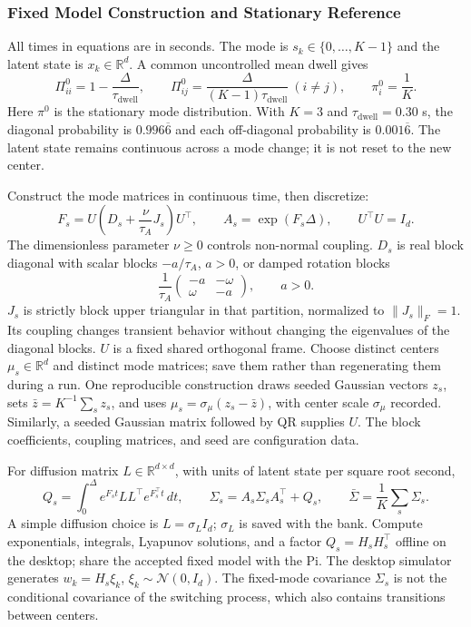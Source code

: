 \subsubsection{Fixed Model Construction and Stationary Reference}
All times in equations are in seconds. The mode is $s_k\in\{0,\ldots,K-1\}$ and the latent state is $x_k\in\mathbb R^d$. A common uncontrolled mean dwell gives
\begin{equation}
 \Pi^0_{ii}=1-\frac{\Delta}{\tau_{\mathrm{dwell}}},\qquad
 \Pi^0_{ij}=\frac{\Delta}{(K-1)\tau_{\mathrm{dwell}}}\ (i\ne j),
 \qquad \pi^0_i=\frac1K.
 \label{eq:baseline-markov}
\end{equation}
Here $\pi^0$ is the stationary mode distribution. With $K=3$ and $\tau_{\mathrm{dwell}}=0.30$ s, the diagonal probability is $0.996\overline6$ and each off-diagonal probability is $0.001\overline6$. The latent state remains continuous across a mode change; it is not reset to the new center.

Construct the mode matrices in continuous time, then discretize:
\begin{equation}
 F_s=U\left(D_s+\frac{\nu}{\tau_A}J_s\right)U^{\top},\qquad
 A_s=\exp(F_s\Delta),\qquad U^{\top}U=I_d.
 \label{eq:bank-construction}
\end{equation}
The dimensionless parameter $\nu\ge0$ controls non-normal coupling. $D_s$ is real block diagonal with scalar blocks $-a/\tau_A$, $a>0$, or damped rotation blocks
\begin{equation}
 \frac1{\tau_A}\begin{pmatrix}-a&-\omega\\\omega&-a\end{pmatrix},
 \qquad a>0.
\end{equation}
$J_s$ is strictly block upper triangular in that partition, normalized to $\|J_s\|_F=1$. Its coupling changes transient behavior without changing the eigenvalues of the diagonal blocks. $U$ is a fixed shared orthogonal frame. Choose distinct centers $\mu_s\in\mathbb R^d$ and distinct mode matrices; save them rather than regenerating them during a run. One reproducible construction draws seeded Gaussian vectors $z_s$, sets $\bar z=K^{-1}\sum_s z_s$, and uses $\mu_s=\sigma_\mu(z_s-\bar z)$, with center scale $\sigma_\mu$ recorded. Similarly, a seeded Gaussian matrix followed by QR supplies $U$. The block coefficients, coupling matrices, and seed are configuration data.

For diffusion matrix $L\in\mathbb R^{d\times d}$, with units of latent state per square root second,
\begin{equation}
 Q_s=\int_0^\Delta e^{F_st}LL^{\top}e^{F_s^{\top}t}\,dt,
 \qquad \Sigma_s=A_s\Sigma_s A_s^{\top}+Q_s,\qquad
 \bar\Sigma=\frac1K\sum_s\Sigma_s.
 \label{eq:noise-lyapunov}
\end{equation}
A simple diffusion choice is $L=\sigma_L I_d$; $\sigma_L$ is saved with the bank. Compute exponentials, integrals, Lyapunov solutions, and a factor $Q_s=H_sH_s^{\top}$ offline on the desktop; share the accepted fixed model with the Pi. The desktop simulator generates $w_k=H_s\xi_k$, $\xi_k\sim\mathcal N(0,I_d)$. The fixed-mode covariance $\Sigma_s$ is not the conditional covariance of the switching process, which also contains transitions between centers.

